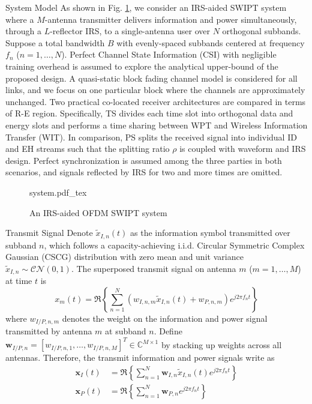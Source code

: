 \documentclass[journal]{IEEEtran}
\begin{document}
\begin{section}{System Model}
	As shown in Fig. \ref{fi:system}, we consider an IRS-aided SWIPT system where a $M$-antenna transmitter delivers information and power simultaneously, through a $L$-reflector IRS, to a single-antenna user over $N$ orthogonal subbands. Suppose a total bandwidth $B$ with evenly-spaced subbands centered at frequency $f_n$ ($n=1,\dots,N$). Perfect Channel State Information (CSI) with negligible training overhead is assumed to explore the analytical upper-bound of the proposed design. A quasi-static block fading channel model is considered for all links, and we focus on one particular block where the channels are approximately unchanged. Two practical co-located receiver architectures are compared in terms of R-E region. Specifically, TS divides each time slot into orthogonal data and energy slots and performs a time sharing between WPT and Wireless Information Transfer (WIT). In comparison, PS splits the received signal into individual ID and EH streams such that the splitting ratio $\rho$ is coupled with waveform and IRS design. Perfect synchronization is assumed among the three parties in both scenarios, and signals reflected by IRS for two and more times are omitted.

	\begin{figure}
		\centering
		\def\svgwidth{\columnwidth}
		{system.pdf_tex}
		\caption{An IRS-aided OFDM SWIPT system}
		\label{fi:system}
	\end{figure}

	\begin{subsection}{Transmit Signal}
		Denote $\tilde{x}_{I,n}(t)$ as the information symbol transmitted over subband $n$, which follows a capacity-achieving i.i.d. Circular Symmetric Complex Gaussian (CSCG) distribution with zero mean and unit variance $\tilde{x}_{I,n}\sim\mathcal{CN}(0,1)$. The superposed transmit signal on antenna $m$ ($m=1,\dots,M$) at time $t$ is
		\begin{equation}\label{eq:x_m}
			x_m(t)=\Re\left\{\sum_{n=1}^N\left({w_{I,n,m}\tilde{x}_{I,n}(t)}+w_{P,n,m}\right){e^{j2{\pi}{f_n}{t}}}\right\}
		\end{equation}
		where $w_{I/P,n,m}$ denotes the weight on the information and power signal transmitted by antenna $m$ at subband $n$. Define $\boldsymbol{w}_{I/P,n}=[w_{I/P,n,1},\dots,w_{I/P,n,M}]^T \in \mathbb{C}^{M \times 1}$ by stacking up weights across all antennas. Therefore, the transmit information and power signals write as
		\begin{align}
			\boldsymbol{x}_{I}(t) &= \Re{\left\{\sum_{n=1}^N\boldsymbol{w}_{I,n}\tilde{x}_{I,n}(t){e^{j2{\pi}{f_n}{t}}}\right\}}\label{eq:x_I}\\
			\boldsymbol{x}_{P}(t) &= \Re{\left\{\sum_{n=1}^N\boldsymbol{w}_{P,n}{e^{j2{\pi}{f_n}{t}}}\right\}}\label{eq:x_P}
		\end{align}
	\end{subsection}


\end{section}
\end{document}

